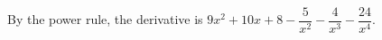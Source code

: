 By the power rule, the derivative is $\boxed{9x^2+10x+8-\dfrac5{x^2}-\dfrac4{x^3}-\dfrac{24}{x^4}}$.
